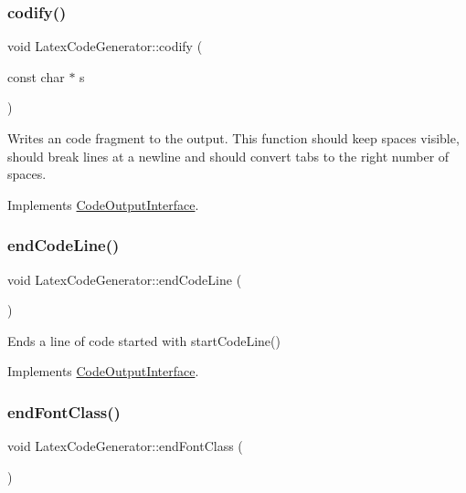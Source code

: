 \subsubsection{\texorpdfstring{codify()}{codify()}}
{\footnotesize\ttfamily void Latex\+Code\+Generator\+::codify (\begin{DoxyParamCaption}\item[{const char $\ast$}]{s }\end{DoxyParamCaption})\hspace{0.3cm}{\ttfamily [virtual]}}

Writes an code fragment to the output. This function should keep spaces visible, should break lines at a newline and should convert tabs to the right number of spaces. 

Implements \mbox{\hyperlink{class_code_output_interface_aa29a5eedda08596ace50ed5b59c8ae7f}{Code\+Output\+Interface}}.

\mbox{\label{class_latex_code_generator_a8e32150386fe38561a0b2c82611fee9d}} 
\subsubsection{\texorpdfstring{endCodeLine()}{endCodeLine()}}
{\footnotesize\ttfamily void Latex\+Code\+Generator\+::end\+Code\+Line (\begin{DoxyParamCaption}{ }\end{DoxyParamCaption})\hspace{0.3cm}{\ttfamily [virtual]}}

Ends a line of code started with start\+Code\+Line() 

Implements \mbox{\hyperlink{class_code_output_interface_afac5763eafc78f93b82691fb9a6dcff7}{Code\+Output\+Interface}}.

\mbox{\label{class_latex_code_generator_a2b3c977134c51f9775042a0c7f469077}} 
\subsubsection{\texorpdfstring{endFontClass()}{endFontClass()}}
{\footnotesize\ttfamily void Latex\+Code\+Generator\+::end\+Font\+Class (\begin{DoxyParamCaption}{ }\end{DoxyParamCaption})\hspace{0.3cm}{\ttfamily [virtual]}}

